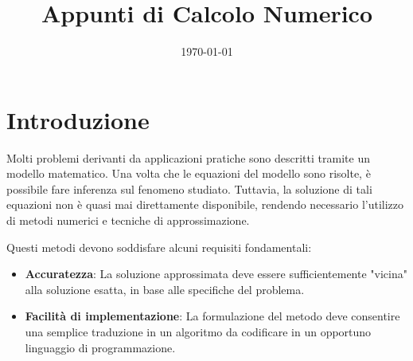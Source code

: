 \documentclass{article}
\title{Appunti di Calcolo Numerico}
\author{} %
\date{\today}
\theoremstyle{break}
\theoremstyle{definition}
\begin{document}
\maketitle

\tableofcontents

\newpage %

\section{Introduzione}

Molti problemi derivanti da applicazioni pratiche sono descritti tramite un modello matematico. Una volta che le equazioni del modello sono risolte, è possibile fare inferenza sul fenomeno studiato. Tuttavia, la soluzione di tali equazioni non è quasi mai direttamente disponibile, rendendo necessario l'utilizzo di metodi numerici e tecniche di approssimazione.

Questi metodi devono soddisfare alcuni requisiti fondamentali:
\begin{itemize}
    \item \textbf{Accuratezza}: La soluzione approssimata deve essere sufficientemente "vicina" alla soluzione esatta, in base alle specifiche del problema.
    \item \textbf{Facilità di implementazione}: La formulazione del metodo deve consentire una semplice traduzione in un algoritmo da codificare in un opportuno linguaggio di programmazione.
\end{itemize}












\end{document}
